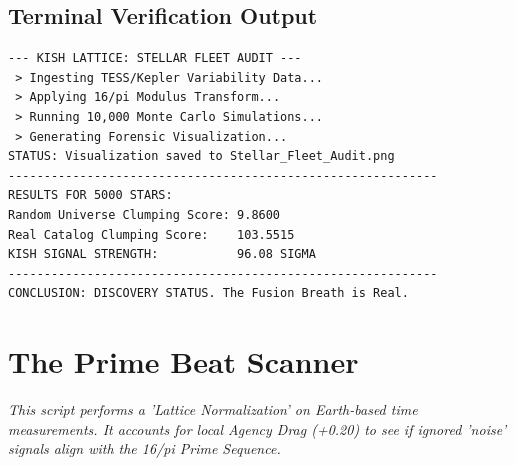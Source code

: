 \documentclass[11pt, letterpaper, openany]{book}
\begin{document}
\section*{Terminal Verification Output}
\begin{lstlisting}[style=terminal, caption={Execution Log: Stellar Fleet Audit}]
--- KISH LATTICE: STELLAR FLEET AUDIT ---
 > Ingesting TESS/Kepler Variability Data...
 > Applying 16/pi Modulus Transform...
 > Running 10,000 Monte Carlo Simulations...
 > Generating Forensic Visualization...
STATUS: Visualization saved to Stellar_Fleet_Audit.png
------------------------------------------------------------
RESULTS FOR 5000 STARS:
Random Universe Clumping Score: 9.8600
Real Catalog Clumping Score:    103.5515
KISH SIGNAL STRENGTH:           96.08 SIGMA
------------------------------------------------------------
CONCLUSION: DISCOVERY STATUS. The Fusion Breath is Real.

\end{lstlisting}


\chapter{The Prime Beat Scanner}
\label{app:prime_scan}
\textit{This script performs a 'Lattice Normalization' on Earth-based time measurements. It accounts for local Agency Drag (+0.20) to see if ignored 'noise' signals align with the 16/pi Prime Sequence.}
\end{document}
